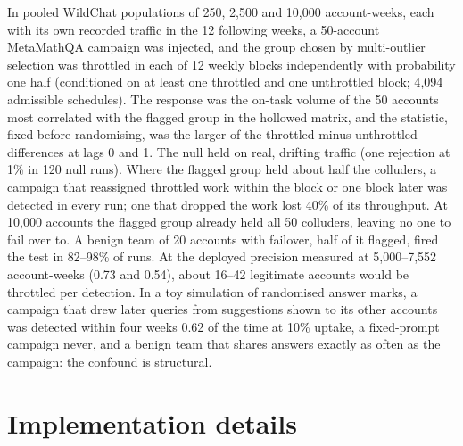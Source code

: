 In pooled WildChat populations of 250, 2{,}500 and 10{,}000 account-weeks, each with its own recorded traffic in the 12 following weeks, a 50-account MetaMathQA campaign was injected, and the group chosen by multi-outlier selection was throttled in each of 12 weekly blocks independently with probability one half (conditioned on at least one throttled and one unthrottled block; 4{,}094 admissible schedules). The response was the on-task volume of the 50 accounts most correlated with the flagged group in the hollowed matrix, and the statistic, fixed before randomising, was the larger of the throttled-minus-unthrottled differences at lags 0 and 1. The null held on real, drifting traffic (one rejection at 1\% in 120 null runs). Where the flagged group held about half the colluders, a campaign that reassigned throttled work within the block or one block later was detected in every run; one that dropped the work lost 40\% of its throughput. At 10{,}000 accounts the flagged group already held all 50 colluders, leaving no one to fail over to. A benign team of 20 accounts with failover, half of it flagged, fired the test in 82--98\% of runs. At the deployed precision measured at 5{,}000--7{,}552 account-weeks (0.73 and 0.54), about 16--42 legitimate accounts would be throttled per detection. In a toy simulation of randomised answer marks, a campaign that drew later queries from suggestions shown to its other accounts was detected within four weeks 0.62 of the time at 10\% uptake, a fixed-prompt campaign never, and a benign team that shares answers exactly as often as the campaign: the confound is structural.





\clearpage
\section{Implementation details}
\label{app:impl}

